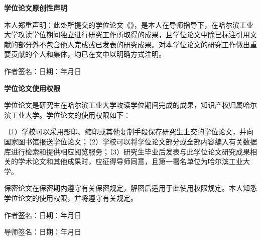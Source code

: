 \begingroup
\fontsize{12bp}{18bp}\selectfont

\begin{center}\bfseries 学位论文原创性声明\end{center}

本人郑重声明：此处所提交的学位论文《\ThesisTitle》，是本人在导师指导下，在哈尔滨工业大学攻读学位期间独立进行研究工作所取得的成果，且学位论文中除已标注引用文献的部分外不包含他人完成或已发表的研究成果。对本学位论文的研究工作做出重要贡献的个人和集体，均已在文中以明确方式注明。

\vspace{7mm}
\noindent 作者签名：\makebox[32mm]{\hrulefill}\hfill 日期：\quad 年\quad 月\quad 日

\vspace{8mm}
\begin{center}\bfseries 学位论文使用权限\end{center}

学位论文是研究生在哈尔滨工业大学攻读学位期间完成的成果，知识产权归属哈尔滨工业大学。学位论文的使用权限如下：

（1）学校可以采用影印、缩印或其他复制手段保存研究生上交的学位论文，并向国家图书馆报送学位论文；（2）学校可以将学位论文部分或全部内容编入有关数据库进行检索和提供相应阅览服务；（3）研究生毕业后发表与此学位论文研究成果相关的学术论文和其他成果时，应征得导师同意，且第一署名单位为哈尔滨工业大学。

保密论文在保密期内遵守有关保密规定，解密后适用于此使用权限规定。本人知悉学位论文的使用权限，并将遵守有关规定。

\vspace{7mm}
\noindent 作者签名：\makebox[32mm]{\hrulefill}\hfill 日期：\quad 年\quad 月\quad 日

\vspace{7mm}
\noindent 导师签名：\makebox[32mm]{\hrulefill}\hfill 日期：\quad 年\quad 月\quad 日
\par\endgroup
